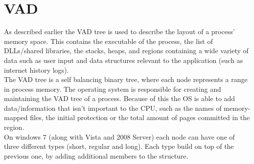 \documentclass[a4paper]{article}
\begin{document}
\section{VAD}





As described earlier the VAD tree is used to describe the layout of a process' memory space. This contains the executable of the process, the list of DLLs/shared libraries, the stacks, heaps, and regions containing a wide variety of data such as user input and data structures relevant to the application (such as internet history logs). \\
The VAD tree is a self balancing binary tree, where each node represents a range in process memory. The operating system is responsible for creating and maintaining the VAD tree of a process. Because of this the OS is able to add data/information that isn't important to the CPU, such as the names of memory-mapped files, the initial protection or the total amount of pages committed in the region. \\
On windows 7 (along with Vista and 2008 Server) each node can have one of three different types (short, regular and long). Each type build on top of the previous one, by adding additional members to the structure. 
\end{document}
